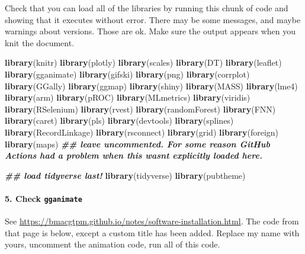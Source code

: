 \documentclass[
]{article}
\newenvironment{Shaded}{\begin{snugshade}}{\end{snugshade}}
\newcommand{\DocumentationTok}[1]{\textcolor[rgb]{0.56,0.35,0.01}{\textbf{\textit{#1}}}}
\newcommand{\FunctionTok}[1]{\textcolor[rgb]{0.13,0.29,0.53}{\textbf{#1}}}
\newcommand{\NormalTok}[1]{#1}
\begin{document}
Check that you can load all of the libraries by running this chunk of
code and showing that it executes without error. There may be some
messages, and maybe warnings about versions. Those are ok. Make sure the
output appears when you knit the document.

\begin{Shaded}
\begin{Highlighting}[]
\FunctionTok{library}\NormalTok{(knitr)}
\FunctionTok{library}\NormalTok{(plotly)}
\FunctionTok{library}\NormalTok{(scales)}
\FunctionTok{library}\NormalTok{(DT)}
\FunctionTok{library}\NormalTok{(leaflet)}
\FunctionTok{library}\NormalTok{(gganimate)}
\FunctionTok{library}\NormalTok{(gifski)}
\FunctionTok{library}\NormalTok{(png)}
\FunctionTok{library}\NormalTok{(corrplot)}
\FunctionTok{library}\NormalTok{(GGally)}
\FunctionTok{library}\NormalTok{(ggmap)}
\FunctionTok{library}\NormalTok{(shiny)}
\FunctionTok{library}\NormalTok{(MASS)}
\FunctionTok{library}\NormalTok{(lme4)}
\FunctionTok{library}\NormalTok{(arm)}
\FunctionTok{library}\NormalTok{(pROC)}
\FunctionTok{library}\NormalTok{(MLmetrics)}
\FunctionTok{library}\NormalTok{(viridis)}
\FunctionTok{library}\NormalTok{(RSelenium)}
\FunctionTok{library}\NormalTok{(rvest)}
\FunctionTok{library}\NormalTok{(randomForest)}
\FunctionTok{library}\NormalTok{(FNN)}
\FunctionTok{library}\NormalTok{(caret)}
\FunctionTok{library}\NormalTok{(pls)}
\FunctionTok{library}\NormalTok{(devtools)}
\FunctionTok{library}\NormalTok{(splines)}
\FunctionTok{library}\NormalTok{(RecordLinkage)}
\FunctionTok{library}\NormalTok{(rsconnect)}
\FunctionTok{library}\NormalTok{(grid)}
\FunctionTok{library}\NormalTok{(foreign)}
\FunctionTok{library}\NormalTok{(maps) }\DocumentationTok{\#\# leave uncommented. For some reason GitHub Actions had a problem when this wasn\textquotesingle{}t explicitly loaded here. }

\DocumentationTok{\#\# load tidyverse last!}
\FunctionTok{library}\NormalTok{(tidyverse)}
\FunctionTok{library}\NormalTok{(pubtheme)}
\end{Highlighting}
\end{Shaded}

\hypertarget{check-gganimate}{%
\paragraph{\texorpdfstring{5. Check
\texttt{gganimate}}{5. Check gganimate}}\label{check-gganimate}}

See \url{https://bmacgtpm.github.io/notes/software-installation.html}.
The code from that page is below, except a custom title has been added.
Replace my name with yours, uncomment the animation code, run all of
this code.
\end{document}

